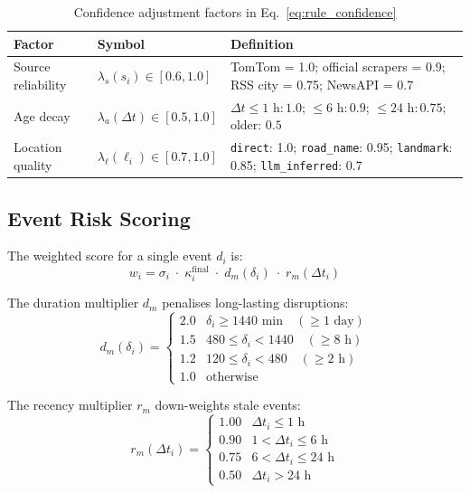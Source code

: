 \begin{table}[H]
\centering
\caption{Confidence adjustment factors in Eq.~\eqref{eq:rule_confidence}}
\begin{tabular}{llp{7.5cm}}
\toprule
\textbf{Factor} & \textbf{Symbol} & \textbf{Definition} \\
\midrule
Source reliability
  & $\lambda_s(s_i) \in [0.6, 1.0]$
  & TomTom = 1.0; official scrapers = 0.9;
    RSS city = 0.75; NewsAPI = 0.7 \\[4pt]
Age decay
  & $\lambda_a(\Delta t) \in [0.5, 1.0]$
  & $\Delta t \leq 1\text{ h}: 1.0$;\;
    $\leq 6\text{ h}: 0.9$;\;
    $\leq 24\text{ h}: 0.75$;\;
    older: $0.5$ \\[4pt]
Location quality
  & $\lambda_\ell(\ell_i) \in [0.7, 1.0]$
  & \texttt{direct}: 1.0;\;
    \texttt{road\_name}: 0.95;\;
    \texttt{landmark}: 0.85;\;
    \texttt{llm\_inferred}: 0.7 \\
\bottomrule
\end{tabular}
\end{table}

\subsection{Event Risk Scoring}

The weighted score for a single event $d_i$ is:
\begin{equation}
  w_i = \sigma_i \;\cdot\; \kappa_i^{\text{final}}
        \;\cdot\; d_m(\delta_i) \;\cdot\; r_m(\Delta t_i)
  \label{eq:weighted_score}
\end{equation}

The duration multiplier $d_m$ penalises long-lasting disruptions:
\begin{equation}
  d_m(\delta_i) =
  \begin{cases}
    2.0 & \delta_i \geq 1440 \text{ min} \quad (\geq\!1\text{ day})\\
    1.5 & 480 \leq \delta_i < 1440 \quad (\geq\!8\text{ h})\\
    1.2 & 120 \leq \delta_i < 480  \quad (\geq\!2\text{ h})\\
    1.0 & \text{otherwise}
  \end{cases}
  \label{eq:duration_mult}
\end{equation}

The recency multiplier $r_m$ down-weights stale events:
\begin{equation}
  r_m(\Delta t_i) =
  \begin{cases}
    1.00 & \Delta t_i \leq 1\text{ h} \\
    0.90 & 1 < \Delta t_i \leq 6\text{ h} \\
    0.75 & 6 < \Delta t_i \leq 24\text{ h} \\
    0.50 & \Delta t_i > 24\text{ h}
  \end{cases}
  \label{eq:recency_mult}
\end{equation}

